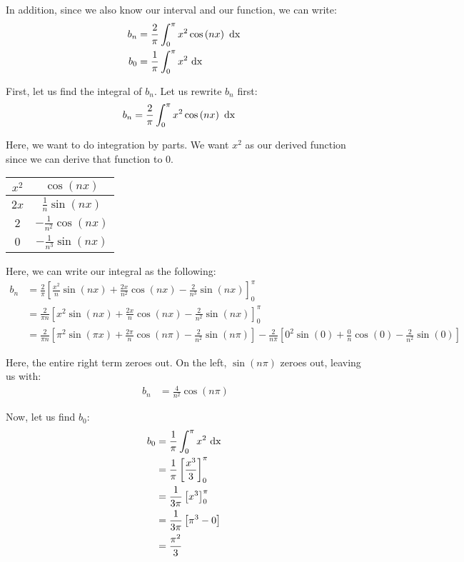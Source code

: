 \documentclass{article}
\begin{document}
\begin{enumerate}
\begin{enumerate}
    In addition, since we also know our interval and our function, we can write:
    \begin{align}
      b_n & = \frac{2}{\pi} \int^\pi_0 x^2 \cos\left( n x \right) \text{ dx }\\
      b_0 & = \frac{1}{\pi} \int^\pi_0 x^2 \text{ dx }
    \end{align}

    First, let us find the integral of $b_n$. Let us rewrite $b_n$ first:
    \begin{align}
      b_n & = \frac{2}{\pi} \int^\pi_0 x^2 \cos\left( n x \right) \text{ dx }
    \end{align}

    Here, we want to do integration by parts. We want $x^2$ as our derived function since we can derive that function to $0$.

    \begin{center}
      \begin{tabular}{c|c}
        $x^2$ & $\displaystyle \cos(n x)$\\
        \hline
        $2x$ & $\displaystyle \frac{1}{n} \sin(n x)$\\
        \hline
        $2$ & $\displaystyle -\frac{1}{n^2} \cos(n x)$\\
        \hline
        $0$ & $\displaystyle -\frac{1}{n^3} \sin(n x)$
      \end{tabular}
    \end{center}

    Here, we can write our integral as the following:
    \begin{align}
      b_n & = \frac{2}{\pi} \left[ \frac{x^2}{n} \sin(n x) + \frac{2x}{n^2} \cos(n x) - \frac{2}{n^3} \sin(n x) \right]^\pi_0\\
      & = \frac{2}{\pi n} \left[ x^2 \sin(n x) + \frac{2x}{n} \cos(n x) - \frac{2}{n^2} \sin(n x) \right]^\pi_0\\
      & = \frac{2}{\pi n} \left[ \pi^2 \sin(\pi x) + \frac{2\pi}{n} \cos(n \pi) - \frac{2}{n^2} \sin(n \pi) \right] - \frac{2}{n \pi} \left[ 0^2 \sin(0) + \frac{0}{n} \cos(0) - \frac{2}{n^2} \sin(0) \right]
    \end{align}

    Here, the entire right term zeroes out. On the left, $\sin(n \pi)$ zeroes out, leaving us with:
    \begin{align}
      b_n & = \frac{4}{n^2} \cos(n \pi)
    \end{align}

    Now, let us find $b_0$:
    \begin{align}
      b_0 & = \frac{1}{\pi} \int^\pi_0 x^2 \text{ dx }\\
      & = \frac{1}{\pi} \left[ \frac{x^3}{3} \right]^\pi_0\\
      & = \frac{1}{3\pi} \left[ x^3 \right]^\pi_0\\
      & = \frac{1}{3\pi} \left[ \pi^3 - 0 \right]\\
      & = \frac{\pi^2}{3}
    \end{align}


\end{enumerate}
\end{enumerate}
\end{document}
